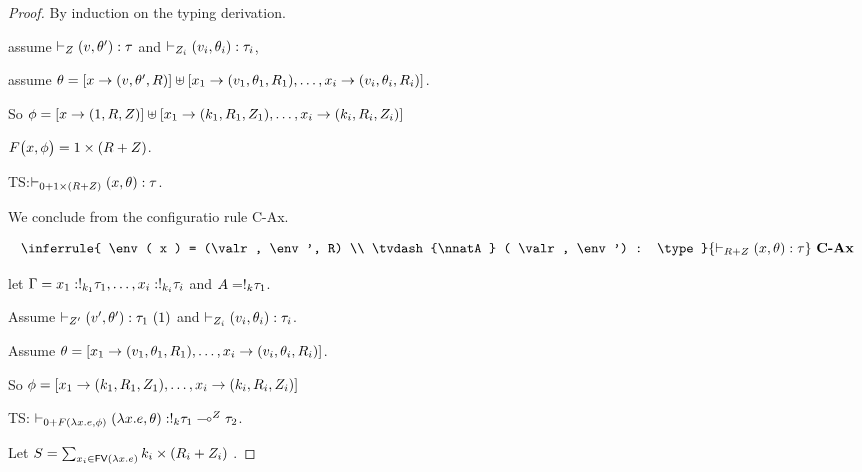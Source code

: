 \begin{proof}
  By induction on the typing derivation.\\


  assume $ \vdash_{Z} (v, \theta') :  \tau$ and $ \vdash_{Z_i} (v_i,
  \theta_i) :  \tau_i  $,
 

  assume $\theta =  [x \to (v, \theta', R)] \uplus [ x_1 \to (v_1,
  \theta_1, R_1), \ldots,   x_i \to (v_i,
  \theta_i, R_i)]   $.

  So $\phi = [x \to (1, R, Z) ] \uplus [ x_1 \to (k_1,
  R_1, Z_1), \ldots,   x_i \to (k_i,  R_i, Z_i)] $

  $F\big(x, \phi \big) = 1 \times (R + Z)  $.

  TS:$\vdash_{0 +1 \times (R+ Z ) } ( x,   \theta  ) : \tau $.

   
  
  We conclude from the configuratio rule C-Ax.
  
  \[ \inferrule{
     \env ( x ) = (\valr, \env', R)
      \\
      \tvdash{\nnatA} ( \valr, \env') : \type
    }{
     \tvdash{\adapt+\nnatA}   ( x, \env):  \type
    }~\textbf{C-Ax}
  \]


  let $\Gamma =x_1: !_{k_1} \tau_1 , \ldots,  x_i : !_{k_i} \tau_i$ and  $A = !_{k} \tau_1$.

  Assume $\vdash_{Z'}  (v', \theta')  :  \tau_1 ~(1)$ and $
  \vdash_{Z_i} (v_i, \theta_i) :  \tau_i  $.

Assume  $ \theta =  [x_1 \to (v_1, \theta_1, R_1), \ldots,   x_i \to (v_i, \theta_i, R_i)]  $.

So $\phi =  [ x_1 \to (k_1,
  R_1, Z_1), \ldots,   x_i \to (k_i,  R_i, Z_i)] $

  TS: $ \vdash_{0 + F(\lambda x. e,  \phi )  }   (\lambda
  x.e,  \theta) :  !_{k} \tau_1  \multimap^{Z} \tau_2 $. 

  Let $S = \sum_{x_i \in \mathsf{FV} (\lambda x. e) } k_i \times
  (R_i + Z_i)    $ .


\end{proof}
